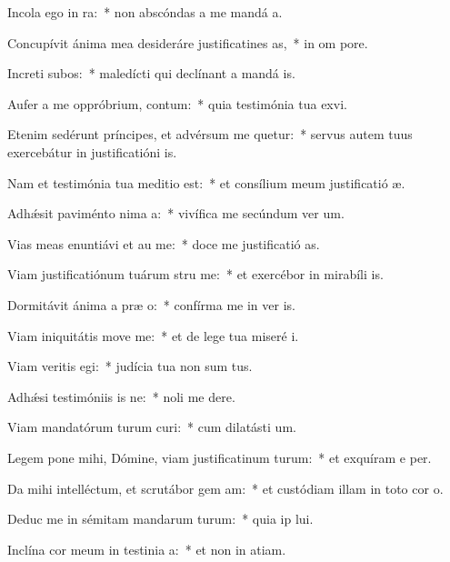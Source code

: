 \item Incola ego  in ra:~* non abscóndas a me mandá a.
\item Concupívit ánima mea desideráre justificatines as,~* in om pore.
\item Increti subos:~* maledícti qui declínant a mandá is.
\item Aufer a me oppróbrium,  contum:~* quia testimónia tua exvi.
\item Etenim sedérunt príncipes, et advérsum me quetur:~* servus autem tuus exercebátur in justificatióni is.
\item Nam et testimónia tua meditio  est:~* et consílium meum justificatió æ.
\item Adhǽsit paviménto nima a:~* vivífica me secúndum ver um.
\item Vias meas enuntiávi et au me:~* doce me justificatió as.
\item Viam justificatiónum tuárum stru me:~* et exercébor in mirabíli is.
\item Dormitávit ánima a præ o:~* confírma me in ver is.
\item Viam iniquitátis move  me:~* et de lege tua miseré i.
\item Viam veritis egi:~* judícia tua non sum tus.
\item Adhǽsi testimóniis is ne:~* noli me dere.
\item Viam mandatórum turum curi:~* cum dilatásti  um.
\item Legem pone mihi, Dómine, viam justificatinum turum:~* et exquíram e per.
\item Da mihi intelléctum, et scrutábor gem am:~* et custódiam illam in toto cor o.
\item Deduc me in sémitam mandarum turum:~* quia ip lui.
\item Inclína cor meum in testinia a:~* et non in atiam.
